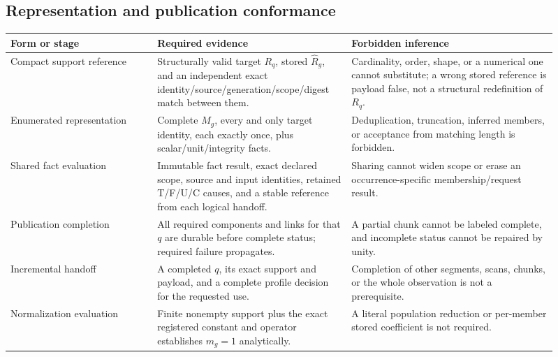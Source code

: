 \ifengineeringview

\subsection{Representation and publication conformance}

\begin{longtable}{p{0.25\linewidth}p{0.31\linewidth}p{0.35\linewidth}}
\toprule
Form or stage & Required evidence & Forbidden inference\\
\midrule
\endhead
Compact support reference & Structurally valid target \(R_q\), stored
\(\widehat R_g\), and an independent exact
identity/source/generation/scope/digest match between them. & Cardinality,
order, shape, or a numerical one cannot substitute; a wrong stored reference
is payload false, not a structural redefinition of \(R_q\).\\
Enumerated representation & Complete \(M_g\), every and only target identity,
each exactly once, plus scalar/unit/integrity facts. & Deduplication,
truncation, inferred members, or acceptance from matching length is
forbidden.\\
Shared fact evaluation & Immutable fact result, exact declared scope, source
and input identities, retained T/F/U/C causes, and a stable reference from
each logical handoff. & Sharing cannot widen scope or erase an
occurrence-specific membership/request result.\\
Publication completion & All required components and links for that \(q\) are
durable before complete status; required failure propagates. & A partial
chunk cannot be labeled complete, and incomplete status cannot be repaired by
unity.\\
Incremental handoff & A completed \(q\), its exact support and payload, and a
complete profile decision for the requested use. & Completion of other
segments, scans, chunks, or the whole observation is not a prerequisite.\\
Normalization evaluation & Finite nonempty support plus the exact registered
constant and operator establishes \(m_g=1\) analytically. & A literal
population reduction or per-member stored coefficient is not required.\\
\bottomrule
\end{longtable}

\fi

